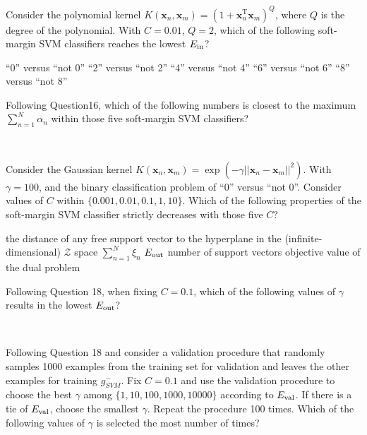 \documentclass[a4paper,10pt]{exam}
\begin{document}
\begin{questions}
  \question Consider the polynomial kernel $K(\mathbf{x}_n,\mathbf{x}_m) = (1+ \mathbf{x}_n^{\mathrm{T}} \mathbf{x}_m)^Q$, where $Q$ is the degree of the polynomial. With $C=0.01$, $Q=2$, which of the following soft-margin SVM classifiers reaches the lowest $E_{\rm in}$?
  \begin{choices}
  	\choice ``0'' versus ``not 0''
  	\choice ``2'' versus ``not 2''
  	\choice ``4'' versus ``not 4''
  	\choice ``6'' versus ``not 6''
  	\CorrectChoice ``8'' versus ``not 8''\\
  \end{choices}
  
  \question Following Question16, which of the following numbers is closest to the maximum $\sum_{n=1}^N \alpha_n$ within those five soft-margin SVM classifiers?
  \begin{choices}
    \\	
  \end{choices}
  
  \question Consider the Gaussian kernel $K(\mathbf{x}_n,\mathbf{x}_m)= \exp\left(-\gamma ||\mathbf{x}_n - \mathbf{x}_m||^2 \right)$. With $\gamma = 100$, and the binary classification problem of ``0'' versus ``not 0''. Consider values of $C$ within $\{0.001, 0.01, 0.1, 1, 10\}$. Which of the following properties of the soft-margin SVM classifier strictly decreases with those five $C$?
  \begin{choices}
  	\CorrectChoice the distance of any free support vector to the hyperplane in the (infinite-dimensional) $\mathcal{Z}$ space
  	\CorrectChoice $\sum_{n=1}^N \xi_n$
  	\choice $E_{\rm out}$
  	\choice number of support vectors
  	\CorrectChoice objective value of the dual problem\\ 	
  \end{choices}
  
  \question Following Question 18, when fixing $C=0.1$, which of the following values of $\gamma$ results in the lowest $E_{\rm out}$?
  \begin{choices}
  	\\
  \end{choices}
  
  \question Following Question 18 and consider a validation procedure that randomly samples 1000 examples from the training set for validation and leaves the other examples for training $g^{-}_{SVM}$. Fix $C=0.1$ and use the validation procedure to choose the best $\gamma$ among $\{1, 10, 100, 1000, 10000\}$ according to $E_{\rm val}$. If there is a tie of $E_{\rm val}$, choose the smallest $\gamma$. Repeat the procedure 100 times. Which of the following values of $\gamma$ is selected the most number of times?
  
  \begin{choices}
  	\\
  \end{choices}
\end{questions}
\clearpage 
\end{document}
